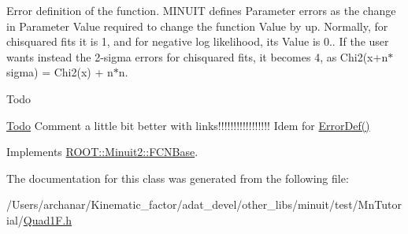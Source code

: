 Error definition of the function. M\+I\+N\+U\+IT defines Parameter errors as the change in Parameter Value required to change the function Value by up. Normally, for chisquared fits it is 1, and for negative log likelihood, its Value is 0.. If the user wants instead the 2-\/sigma errors for chisquared fits, it becomes 4, as Chi2(x+n$\ast$sigma) = Chi2(x) + n$\ast$n.

\begin{DoxyRefDesc}{Todo}
\item[\mbox{\hyperlink{todo__todo000001}{Todo}}]Comment a little bit better with links!!!!!!!!!!!!!!!!! Idem for \mbox{\hyperlink{classROOT_1_1Minuit2_1_1FCNBase_ac4592475c58a65b037ba97ab5f3cba10}{Error\+Def()}}\end{DoxyRefDesc}


Implements \mbox{\hyperlink{classROOT_1_1Minuit2_1_1FCNBase_a04ef08ddad92ce8d89d498efbe021c39}{R\+O\+O\+T\+::\+Minuit2\+::\+F\+C\+N\+Base}}.



The documentation for this class was generated from the following file\+:\begin{DoxyCompactItemize}
\item 
/\+Users/archanar/\+Kinematic\+\_\+factor/adat\+\_\+devel/other\+\_\+libs/minuit/test/\+Mn\+Tutorial/\mbox{\hyperlink{Quad1F_8h}{Quad1\+F.\+h}}\end{DoxyCompactItemize}

